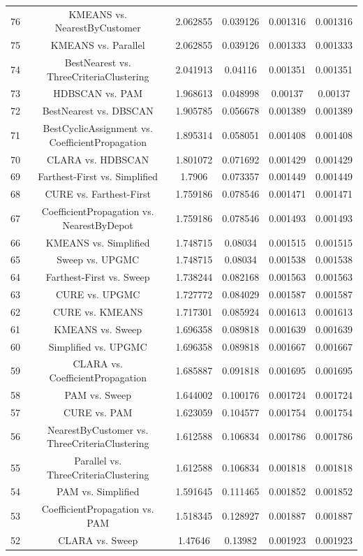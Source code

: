 \documentclass[a4paper,10pt]{article}
\begin{document}
\begin{landscape}
\begin{table}[!htp]
\begin{tabular}{cccccc}
76&KMEANS vs. NearestByCustomer&2.062855&0.039126&0.001316&0.001316\\
75&KMEANS vs. Parallel&2.062855&0.039126&0.001333&0.001333\\
74&BestNearest vs. ThreeCriteriaClustering&2.041913&0.04116&0.001351&0.001351\\
73&HDBSCAN vs. PAM&1.968613&0.048998&0.00137&0.00137\\
72&BestNearest vs. DBSCAN&1.905785&0.056678&0.001389&0.001389\\
71&BestCyclicAssignment vs. CoefficientPropagation&1.895314&0.058051&0.001408&0.001408\\
70&CLARA vs. HDBSCAN&1.801072&0.071692&0.001429&0.001429\\
69&Farthest-First vs. Simplified&1.7906&0.073357&0.001449&0.001449\\
68&CURE vs. Farthest-First&1.759186&0.078546&0.001471&0.001471\\
67&CoefficientPropagation vs. NearestByDepot&1.759186&0.078546&0.001493&0.001493\\
66&KMEANS vs. Simplified&1.748715&0.08034&0.001515&0.001515\\
65&Sweep vs. UPGMC&1.748715&0.08034&0.001538&0.001538\\
64&Farthest-First vs. Sweep&1.738244&0.082168&0.001563&0.001563\\
63&CURE vs. UPGMC&1.727772&0.084029&0.001587&0.001587\\
62&CURE vs. KMEANS&1.717301&0.085924&0.001613&0.001613\\
61&KMEANS vs. Sweep&1.696358&0.089818&0.001639&0.001639\\
60&Simplified vs. UPGMC&1.696358&0.089818&0.001667&0.001667\\
59&CLARA vs. CoefficientPropagation&1.685887&0.091818&0.001695&0.001695\\
58&PAM vs. Sweep&1.644002&0.100176&0.001724&0.001724\\
57&CURE vs. PAM&1.623059&0.104577&0.001754&0.001754\\
56&NearestByCustomer vs. ThreeCriteriaClustering&1.612588&0.106834&0.001786&0.001786\\
55&Parallel vs. ThreeCriteriaClustering&1.612588&0.106834&0.001818&0.001818\\
54&PAM vs. Simplified&1.591645&0.111465&0.001852&0.001852\\
53&CoefficientPropagation vs. PAM&1.518345&0.128927&0.001887&0.001887\\
52&CLARA vs. Sweep&1.47646&0.13982&0.001923&0.001923\\

\end{tabular}
\end{table}
\end{landscape}
\end{document}
